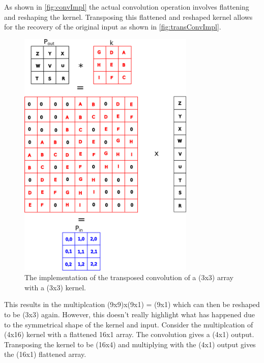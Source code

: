 As shown in \autoref{fig:convImpl} the actual convolution operation involves flattening and reshaping the kernel. Transposing this flattened and reshaped kernel allows for the recovery of the original input as shown in \autoref{fig:transConvImpl}. 

\begin{figure}
	\centering	\includegraphics[width=0.75\textwidth]{Figs/intro2dl/TransconvolutionImplementation.png}
	\caption{The implementation of the transposed convolution of a (3x3) array with a (3x3) kernel.}
	\label{fig:transConvImpl}
\end{figure}

This results in the multiplcation (9x9)x(9x1) = (9x1) which can then be reshaped to be (3x3) again. However, this doesn't really highlight what has happened due to the symmetrical shape of the kernel and input. Consider the multiplcation of (4x16) kernel with a flattened 16x1 array. The convolution gives a (4x1) output. Transposing the kernel to be (16x4) and multiplying with the (4x1) output gives the (16x1) flattened array. 


